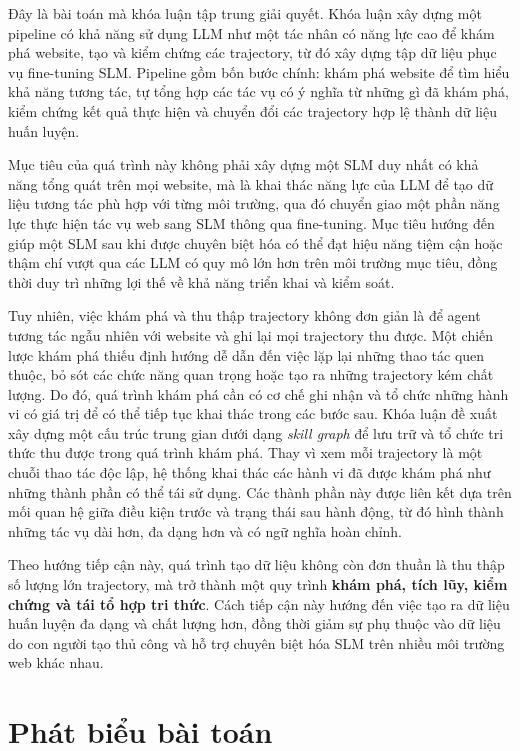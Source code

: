 Đây là bài toán mà khóa luận tập trung giải quyết. Khóa luận xây dựng một pipeline có khả năng sử dụng LLM như một tác nhân có năng lực cao để khám phá website, tạo và kiểm chứng các trajectory, từ đó xây dựng tập dữ liệu phục vụ fine-tuning SLM. Pipeline gồm bốn bước chính: khám phá website để tìm hiểu khả năng tương tác, tự tổng hợp các tác vụ có ý nghĩa từ những gì đã khám phá, kiểm chứng kết quả thực hiện và chuyển đổi các trajectory hợp lệ thành dữ liệu huấn luyện.

Mục tiêu của quá trình này không phải xây dựng một SLM duy nhất có khả năng tổng quát trên mọi website, mà là khai thác năng lực của LLM để tạo dữ liệu tương tác phù hợp với từng môi trường, qua đó chuyển giao một phần năng lực thực hiện tác vụ web sang SLM thông qua fine-tuning. Mục tiêu hướng đến giúp một SLM sau khi được chuyên biệt hóa có thể đạt hiệu năng tiệm cận hoặc thậm chí vượt qua các LLM có quy mô lớn hơn trên môi trường mục tiêu, đồng thời duy trì những lợi thế về khả năng triển khai và kiểm soát.

Tuy nhiên, việc khám phá và thu thập trajectory không đơn giản là để agent tương tác ngẫu nhiên với website và ghi lại mọi trajectory thu được. Một chiến lược khám phá thiếu định hướng dễ dẫn đến việc lặp lại những thao tác quen thuộc, bỏ sót các chức năng quan trọng hoặc tạo ra những trajectory kém chất lượng. Do đó, quá trình khám phá cần có cơ chế ghi nhận và tổ chức những hành vi có giá trị để có thể tiếp tục khai thác trong các bước sau. Khóa luận đề xuất xây dựng một cấu trúc trung gian dưới dạng \emph{skill graph} để lưu trữ và tổ chức tri thức thu được trong quá trình khám phá. Thay vì xem mỗi trajectory là một chuỗi thao tác độc lập, hệ thống khai thác các hành vi đã được khám phá như những thành phần có thể tái sử dụng. Các thành phần này được liên kết dựa trên mối quan hệ giữa điều kiện trước và trạng thái sau hành động, từ đó hình thành những tác vụ dài hơn, đa dạng hơn và có ngữ nghĩa hoàn chỉnh.

Theo hướng tiếp cận này, quá trình tạo dữ liệu không còn đơn thuần là thu thập số lượng lớn trajectory, mà trở thành một quy trình \textbf{khám phá, tích lũy, kiểm chứng và tái tổ hợp tri thức}. Cách tiếp cận này hướng đến việc tạo ra dữ liệu huấn luyện đa dạng và chất lượng hơn, đồng thời giảm sự phụ thuộc vào dữ liệu do con người tạo thủ công và hỗ trợ chuyên biệt hóa SLM trên nhiều môi trường web khác nhau.

\section{Phát biểu bài toán}
\label{sec:intro-problem}


